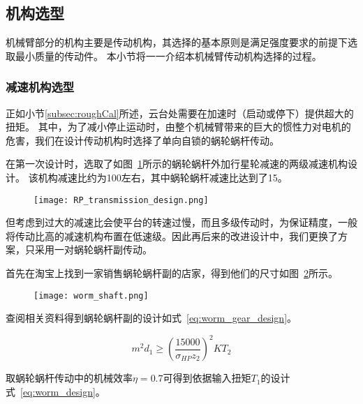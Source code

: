 
\subsection{机构选型}

机械臂部分的机构主要是传动机构，其选择的基本原则是满足强度要求的前提下选取最小质量的传动件。
本小节将一一介绍本机械臂传动机构选择的过程。

\subsubsection{减速机构选型}

正如小节\ref{subsec:roughCal}所述，云台处需要在加速时（启动或停下）提供超大的扭矩。
其中，为了减小停止运动时，由整个机械臂带来的巨大的惯性力对电机的危害，我们在设计传动机构时选择了单向自锁的蜗轮蜗杆传动。

在第一次设计时，选取了如图~\ref{fig:RP_trans}所示的蜗轮蜗杆外加行星轮减速的两级减速机构设计。
该机构减速比约为100左右，其中蜗轮蜗杆减速比达到了15。

\begin{figure}[!h]
    \centering
    \texttt{[image: RP\_transmission\_design.png]}
    \label{fig:RP_trans}
\end{figure}

但考虑到过大的减速比会使平台的转速过慢，而且多级传动时，为保证精度，一般将传动比高的减速机构布置在低速级\cite{MMDM}。因此再后来的改进设计中，我们更换了方案，只采用一对蜗轮蜗杆副传动。

首先在淘宝上找到一家销售蜗轮蜗杆副的店家，得到他们的尺寸如图~\ref{fig:worm_shaft}所示。

\begin{figure}[!h]
    \centering
    \texttt{[image: worm\_shaft.png]}
    \label{fig:worm_shaft}
\end{figure}

查阅相关资料得到蜗轮蜗杆副的设计如式~\ref{eq:worm_gear_design}。

\begin{equation}
    \label{eq:worm_gear_design}
    m^2d_1 \geq (\frac{15000}{\sigma_{HP}z_2})^2KT_2
\end{equation}

取蜗轮蜗杆传动中的机械效率$\eta = 0.7$可得到依据输入扭矩$T_1$的设计式~\ref{eq:worm_design}。

